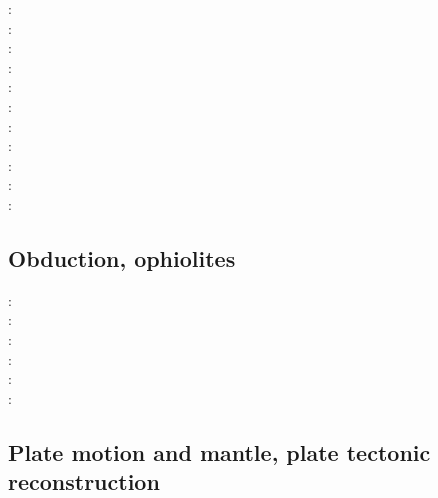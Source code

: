 \begin{scriptsize}
\nineteeneightyfour: \cite{olyb84}\\
\nineteenninety: \cite{ketu90}\\
\nineteenninetysix: \cite{pelt96}\\
\nineteenninetynine: \cite{cori99}\\
\twothousandone: \cite{huke01}\\
\twothousandtwo: \cite{vahb02}\\
\twothousandthree: \cite{fasa03}\cite{vabh03}\\
\twothousandfive: \cite{colt05}\\
\twothousandseven: \cite{gogc07}\cite{nake07}\cite{vabh07}\\
\twothousandeleven: \cite{lemj11}\cite{saad11}\\
\twothousandeighteen: \cite{onzh18}
\end{scriptsize}

\subsection{Obduction, ophiolites}
 

\begin{scriptsize}
\nineteenninety: \cite{hack90}\\
\nineteenninetyone: \cite{hack91}\\
\twothousand: \cite{mokd00}\\
\twothousandfourteen: \cite{agzf14}\\
\twothousandsixteen: \cite{duay16}\\
\twothousandtwenty: \cite{rohb20}
\end{scriptsize}

\subsection{Plate motion and mantle, plate tectonic reconstruction}

